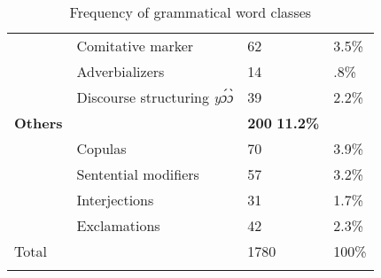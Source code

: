 \begin{table}
\begin{tabular}{ll|ll}
& Comitative marker  & 62  & 3.5\% \\ %
& Adverbializers  & 14 & .8\% \\ %
  & Discourse structuring {\itshape yɔ́ɔ̀}  & 39 & 2.2\% \\
 {\bfseries Others} &  & {\bfseries 200} {\bfseries 11.2\%} \\
 & Copulas  & 70 & 3.9\% \\
 & Sentential modifiers  & 57 & 3.2\% \\
 & Interjections  & 31 & 1.7\% \\
 & Exclamations  & 42 & 2.3\% \\
 \midrule
  Total & & 1780 & 100\% \\
 \lspbottomrule
\end{tabular}
\caption{Frequency of grammatical word classes}
\label{Tab:POSnogram}
\end{table}

\fi


